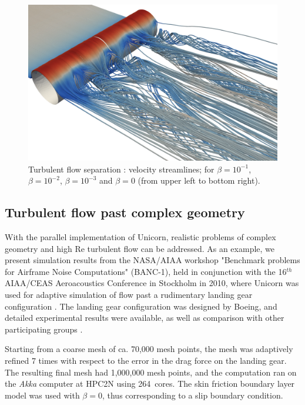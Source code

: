 \begin{figure}
  \includegraphics[width=\twofigs]{chapters/hoffman-1/png/Hoffman_fig5d.png}
  \caption{Turbulent flow separation \citep{HoffmanJansson2009}: velocity
    streamlines; for $\beta = 10^{-1}$, $\beta = 10^{-2}$, $\beta = 10^{-3}$
    and $\beta = 0$ (from upper left to bottom right).}
  \label{hoffman-1:fig:3}
\end{figure}

\subsection{Turbulent flow past complex geometry}

With the parallel implementation of Unicorn, realistic problems of
complex geometry and high Re turbulent flow can be addressed. As an
example, we present simulation results from the NASA/AIAA workshop
"Benchmark problems for Airframe Noise Computations" (BANC-1), held in
conjunction with the 16$^{th}$ AIAA/CEAS Aeroacoustics Conference in
Stockholm in 2010, where Unicorn was used for adaptive simulation of
flow past a rudimentary landing gear configuration
\citep{VilelaJanssonEtAl2010}. The landing gear configuration was
designed by Boeing, and detailed experimental results were available,
as well as comparison with other participating groups
\citep{SpalartMejia2011}.

Starting from a coarse mesh of ca. 70,000 mesh points, the mesh was
adaptively refined 7 times with respect to the error in the drag force
on the landing gear. The resulting final mesh had 1,000,000 mesh
points, and the computation ran on the \textit{Akka} computer at HPC2N
using 264~cores. The skin friction boundary layer model was used with
$\beta=0$, thus corresponding to a slip boundary condition.


